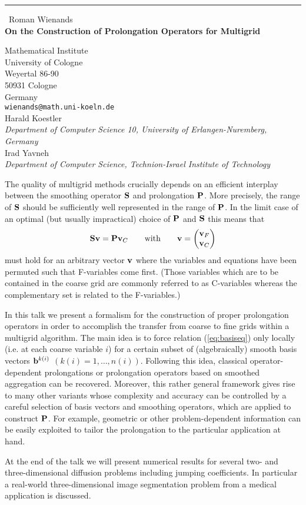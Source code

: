 \documentclass{report}
\begin{document}
\begin{center}
\rule{6in}{1pt} \
{\large Roman Wienands \\
{\bf On the Construction of Prolongation Operators for Multigrid}}

Mathematical Institute \\ University of Cologne \\ Weyertal 86-90 \\ 50931 Cologne \\ Germany
\\
{\tt wienands@math.uni-koeln.de}\\
Harald Koestler\\
{\em Department of Computer Science 10, University of Erlangen-Nuremberg, Germany}\\
Irad Yavneh\\
{\em Department of Computer Science, Technion-Israel Institute of Technology}\end{center}

\def\bfP{{\bf P}}
\def\bfS{{\bf S}}
\def\bfv{{\bf v}}
\def\bfb{{\bf b}}
The quality of multigrid methods crucially depends on an efficient
interplay between the smoothing operator $\bfS$ and prolongation $\bfP$.
More precisely, the range of $\bfS$ should be sufficiently well
represented in the range of $\bfP$. In the limit case of an optimal (but
usually impractical) choice of $\bfP$ and $\bfS$ this means that
\begin{equation}
\bfS \bfv = \bfP \bfv_{C} \qquad \text{with}
\qquad \bfv = \left( \begin{matrix} \bfv_{F} \\ \bfv_{C}
\end{matrix} \right) \label{eq:basiseq}
\end{equation}
must hold for an arbitrary vector $\bfv$ where the variables and
equations have been permuted such that F-variables come first.
(Those variables which are to be contained in the coarse grid are
commonly referred to as C-variables whereas the complementary set is
related to the F-variables.)

In this talk we present a formalism for the construction of proper
prolongation operators in order to accomplish the transfer from coarse to
fine grids within a multigrid algorithm. The main idea is to force
relation
(\ref{eq:basiseq}) only locally (i.e. at each coarse variable $i$) for a
certain subset of (algebraically) smooth basis vectors $\bfb^{k(i)}$
$(k(i) = 1,\dots,n(i))$. Following this
idea, classical operator-dependent prolongations or prolongation
operators based on smoothed aggregation can be recovered. Moreover, this
rather general framework gives rise to many other variants whose
complexity and accuracy can be controlled by a careful selection of basis
vectors and smoothing operators, which are applied to construct $\bfP$.
For example, geometric or other problem-dependent information can be
easily exploited to tailor the prolongation to the particular application
at hand.

At the end of the talk we will present numerical results for several two-
and three-dimensional diffusion problems including jumping coefficients.
In particular a real-world three-dimensional image segmentation problem
from a medical application is discussed.
\end{document}
